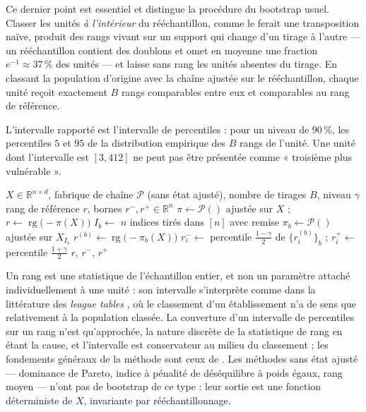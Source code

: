 \documentclass[11pt,a4paper]{article}
\theoremstyle{definition}
\theoremstyle{remark}
\newcommand{\R}{\mathbb{R}}
\newcommand{\rg}{\operatorname{rg}}
\begin{document}
\medskip

Ce dernier point est essentiel et distingue la procédure du bootstrap usuel. Classer les
unités \emph{à l'intérieur} du rééchantillon, comme le ferait une transposition naïve,
produit des rangs vivant sur un support qui change d'un tirage à l'autre --- un
rééchantillon contient des doublons et omet en moyenne une fraction $e^{-1} \approx 37\,\%$
des unités --- et laisse sans rang les unités absentes du tirage. En classant la population
d'origine avec la chaîne ajustée sur le rééchantillon, chaque unité reçoit exactement $B$
rangs comparables entre eux et comparables au rang de référence.

\medskip

L'intervalle rapporté est l'intervalle de percentiles : pour un niveau de $90\,\%$, les
percentiles $5$ et $95$ de la distribution empirique des $B$ rangs de l'unité. Une unité
dont l'intervalle est $[3, 412]$ ne peut pas être présentée comme « troisième plus
vulnérable ».

\medskip

\begin{algorithm}[htbp]
  \caption{Intervalle de rang par bootstrap d'ajustement}
  \label{algo:bootstrap}
  \begin{algorithmic}[1]
    \Require $X \in \R^{n\times d}$, fabrique de chaîne $\mathcal{P}$ (sans état ajusté),
             nombre de tirages $B$, niveau $\gamma$
    \Ensure rang de référence $r$, bornes $r^-, r^+ \in \R^n$
    \State $\pi \gets \mathcal{P}()$ ajustée sur $X$ ; \quad
           $r \gets \rg\big(-\pi(X)\big)$ 
      \State $I_b \gets$ $n$ indices tirés dans $[n]$ avec remise
      \State $\pi_b \gets \mathcal{P}()$ ajustée sur $X_{I_b}$
      \State $r^{(b)} \gets \rg\big(-\pi_b(X)\big)$
    \EndFor
    \State $r^-_i \gets$ percentile $\tfrac{1-\gamma}{2}$ de $\{r^{(b)}_i\}_b$ ; \quad
           $r^+_i \gets$ percentile $\tfrac{1+\gamma}{2}$
    \State \Return $r$, $r^-$, $r^+$
  \end{algorithmic}
\end{algorithm}

\bigskip

Un rang est une statistique de l'échantillon entier, et non un paramètre attaché
individuellement à une unité : son intervalle s'interprète comme dans la littérature des
\emph{league tables} \citep{goldstein1996}, où le classement d'un établissement n'a de sens
que relativement à la population classée. La couverture d'un intervalle de percentiles sur
un rang n'est qu'approchée, la nature discrète de la statistique de rang en étant la cause,
et l'intervalle est conservateur au milieu du classement \citep{xie2009} ; les fondements
généraux de la méthode sont ceux de \citet{efron1994}. Les méthodes sans état ajusté ---
dominance de Pareto, indice à pénalité de déséquilibre à poids égaux, rang moyen --- n'ont
pas de bootstrap de ce type : leur sortie est une fonction déterministe de $X$, invariante
par rééchantillonnage.
\end{document}

